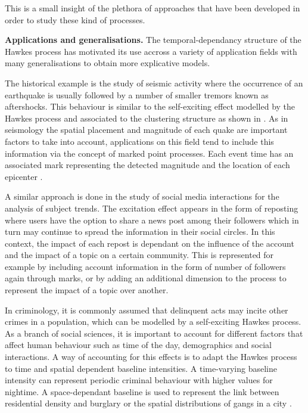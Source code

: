     This is a small insight of the plethora of approaches that have been developed in order to study these kind of processes.
    
    \textbf{Applications and generalisations.}
    The temporal-dependancy structure of the Hawkes process has motivated its use accross a variety of application fields with many generalisations to obtain more explicative models.

    The historical example is the study of seismic activity where the occurrence of an earthquake is usually followed by a number of smaller tremors known as aftershocks.
    This behaviour is similar to the self-exciting effect modelled by the Hawkes process and associated to the clustering structure as shown in \textcite{Adamopoulos1976}.
    As in seismology the spatial placement and magnitude of each quake are important factors to take into account, applications on this field tend to include this information via the concept of marked point processes. 
    Each event time has an associated mark representing the detected magnitude \parencite{Ogata1988} and the location of each epicenter \parencite{Ogata1998, Kwon2023}.

    A similar approach is done in the study of social media interactions for the analysis of subject trends.
    The excitation effect appears in the form of reposting where users have the option to share a news post among their followers which in turn may continue to spread the information in their social circles.
    In this context, the impact of each repost is dependant on the influence of the account and the impact of a topic on a certain community.
    This is represented for example by including account information in the form of number of followers \parencite{Mishra2016} again through marks, or by adding an additional dimension to the process \parencite{Pinto2015} to represent the impact of a topic over another.

    In criminology, it is commonly assumed that delinquent acts may incite other crimes in a population, which can be modelled by a self-exciting Hawkes process.
    As a branch of social sciences, it is important to account for different factors that affect human behaviour such as time of the day, demographics and social interactions.
    A way of accounting for this effects is to adapt the Hawkes process to time and spatial dependent baseline intensities. 
    A time-varying baseline intensity can represent periodic criminal behaviour \parencite{Lewis2011} with higher values for nightime.
    A space-dependant baseline is used to represent the link between residential density and burglary \parencite{Mohler2011} or the spatial distributions of gangs in a city \parencite{Linderman2014}.


